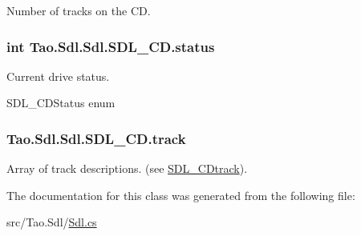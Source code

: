 Number of tracks on the CD. 

\hypertarget{class_tao_1_1_sdl_1_1_sdl_1_1_s_d_l___c_d_a5c6afca95e5c23b41664b17434ea6f28}{
\subsubsection[{status}]{\setlength{\rightskip}{0pt plus 5cm}int {\bf Tao.Sdl.Sdl.SDL\_\-CD.status}}}
\label{class_tao_1_1_sdl_1_1_sdl_1_1_s_d_l___c_d_a5c6afca95e5c23b41664b17434ea6f28}


Current drive status. 

SDL\_\-CDStatus enum \hypertarget{class_tao_1_1_sdl_1_1_sdl_1_1_s_d_l___c_d_abdd4b66871d91cbb568bc907ffcb3107}{
\subsubsection[{track}]{ {\bf Tao.Sdl.Sdl.SDL\_\-CD.track}}}
\label{class_tao_1_1_sdl_1_1_sdl_1_1_s_d_l___c_d_abdd4b66871d91cbb568bc907ffcb3107}


Array of track descriptions. (see \hyperlink{struct_tao_1_1_sdl_1_1_sdl_1_1_s_d_l___c_dtrack}{SDL\_\-CDtrack}). 



The documentation for this class was generated from the following file:\begin{DoxyCompactItemize}
\item 
src/Tao.Sdl/\hyperlink{_sdl_8cs}{Sdl.cs}\end{DoxyCompactItemize}
